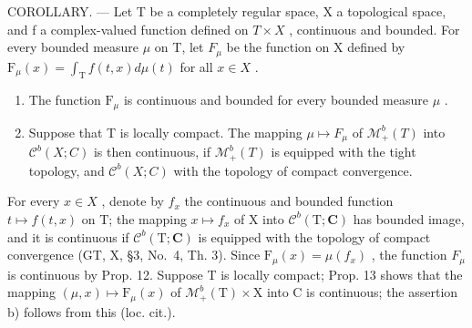 COROLLARY. --- Let T be a completely regular space, X a topological space, and f a complex-valued function defined on \(T \times X\) , continuous and bounded. For every bounded measure \(\mu\) on T, let \(F_{\mu}\) be the function on X defined by \(\mathrm{F}_{\mu}(x) = \int_{\mathrm{T}} f(t, x) d\mu(t)\) for all \(x \in X\) .

\begin{enumerate}
\def\labelenumi{\alph{enumi})}
\item
  The function \(\mathrm{F}_{\mu}\) is continuous and bounded for every bounded measure \(\mu\) .
\item
  Suppose that T is locally compact. The mapping \(\mu\mapsto F_{\mu}\) of \(\mathcal{M}_{+}^{b}(T)\) into \(\mathcal{C}^{b}(X;C)\) is then continuous, if \(\mathcal{M}_{+}^{b}(T)\) is equipped with the tight topology, and \(\mathcal{C}^{b}(X;C)\) with the topology of compact convergence.
\end{enumerate}

For every \(x \in X\) , denote by \(f_{x}\) the continuous and bounded function \(t \mapsto f(t, x)\) on T; the mapping \(x \mapsto f_{x}\) of X into \(\mathcal{C}^{b}(\mathrm{T}; \mathbf{C})\) has bounded image, and it is continuous if \(\mathcal{C}^{b}(\mathrm{T}; \mathbf{C})\) is equipped with the topology of compact convergence (GT, X, §3, No.~4, Th. 3). Since \(\mathrm{F}_{\mu}(x) = \mu(f_{x})\) , the function \(F_{\mu}\) is continuous by Prop. 12. Suppose T is locally compact; Prop. 13 shows that the mapping \((\mu, x) \mapsto \mathrm{F}_{\mu}(x)\) of \(\mathcal{M}_{+}^{b}(\mathrm{T}) \times \mathrm{X}\) into C is continuous; the assertion b) follows from this (loc. cit.).

